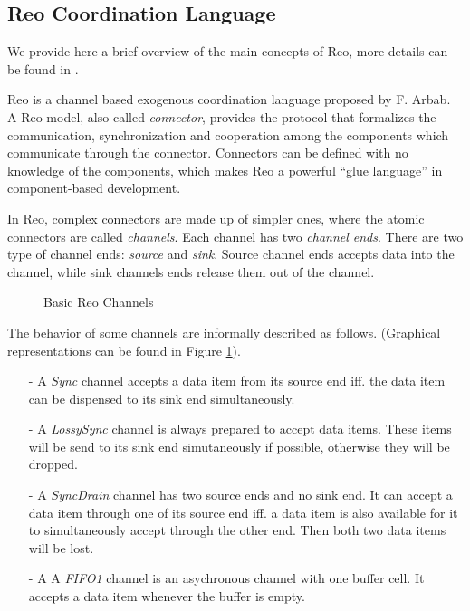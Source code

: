 \documentclass[conference, a4paper]{IEEEtran}
\begin{document}
\subsection{Reo Coordination Language}
\label{sec:reo}
We provide here a brief overview of the main concepts of Reo, more details can be found in
\cite{DBLP:journals/mscs/Arbab04, DBLP:journals/scp/BaierSAR06}.

Reo is a channel based exogenous coordination language proposed by F. Arbab. 
A Reo model, also called \emph{connector}, provides the protocol
that formalizes the communication, synchronization and cooperation among the components which
communicate through the connector. Connectors can be defined with no knowledge of the components,
which makes Reo a powerful ``glue language'' in component-based
development\cite{DBLP:journals/sigsoft/Gill03}.

In Reo, complex connectors are made up of simpler ones, where the atomic connectors are called
\emph{channels}. Each channel has two \emph{channel ends}. There are two type of channel ends:
\emph{source} and \emph{sink}. Source channel ends accepts data into the channel, while sink
channels ends release them out of the channel. 

\begin{figure}[h]
  \begin{center}
    
  \end{center}
  \caption{Basic Reo Channels}
  \label{fig:basic}
\end{figure}

The behavior of some channels are informally described as follows. (Graphical representations
can be found in Figure \ref{fig:basic}).

\begin{itemize}
  \item [-] A \emph{Sync} channel accepts a data item from its source end iff. the data item can be
    dispensed to its sink end simultaneously.
  \item [-] A \emph{LossySync} channel is always prepared to accept data items. These items will be
    send to its sink end simutaneously if possible, otherwise they will be dropped.
  \item [-] A \emph{SyncDrain} channel has two source ends and no sink end. It can accept a data
    item through one of its source end iff. a data item is also available for it to simultaneously
    accept through the other end. Then both two data items will be lost.
  \item [-] A A \emph{FIFO1} channel is an asychronous channel with one buffer cell. It accepts a
    data item whenever the buffer is empty.  
\end{itemize}
\end{document}
